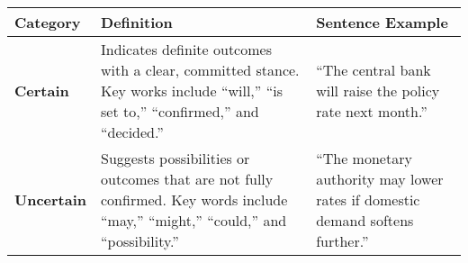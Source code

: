 \begin{table*}
    \caption{}
    \vspace{1em}
    \centering
    \begin{tabular}{p{}p{}p{}}
        \toprule
        \textbf{Category} 
        & \textbf{Definition} 
        & \textbf{Sentence Example} \\
        \midrule
        \textbf{Certain} 
        & Indicates definite outcomes with a clear, committed stance. Key works include ``will,'' ``is set to,'' ``confirmed,'' and ``decided.''
        & “The central bank will raise the policy rate next month.” \\
        \midrule
        \textbf{Uncertain} 
        & Suggests possibilities or outcomes that are not fully confirmed. Key words include ``may,'' ``might,'' ``could,'' and ``possibility.''
        & “The monetary authority may lower rates if domestic demand softens further.” \\
        \bottomrule
    \end{tabular}
    \label{tb:cbc_certainty_guide}

\end{table*}